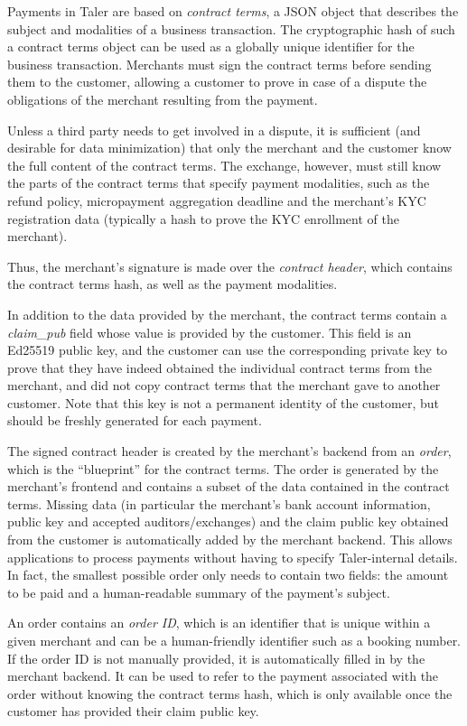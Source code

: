 Payments in Taler are based on \emph{contract terms}, a JSON object that
describes the subject and modalities of a business transaction.  The
cryptographic hash of such a contract terms object can be used as a globally
unique identifier for the business transaction.  Merchants must sign the
contract terms before sending them to the customer, allowing a customer to
prove in case of a dispute the obligations of the merchant resulting from the
payment.

Unless a third party needs to get involved in a dispute, it is sufficient (and
desirable for data minimization) that only the merchant and the customer know
the full content of the contract terms.  The exchange, however,  must still
know the parts of the contract terms that specify payment modalities, such as
the refund policy, micropayment aggregation deadline and the merchant's KYC
registration data (typically a hash to prove the KYC enrollment of the
merchant).

Thus, the merchant's signature is made over the \emph{contract header},
which contains the contract terms hash, as well as the payment modalities.

In addition to the data provided by the merchant, the contract terms contain a
\emph{claim\_pub} field whose value is provided by the customer.
This field is an Ed25519 public key, and the customer can use the corresponding
private key to prove that they have indeed obtained the individual contract
terms from the merchant, and did not copy contract terms that the merchant gave
to another customer.  Note that this key is not a permanent identity of the
customer, but should be freshly generated for each payment.

The signed contract header is created by the merchant's backend from an
\emph{order}, which is the ``blueprint'' for the contract terms.  The order is
generated by the merchant's frontend and contains a subset of the data
contained in the contract terms.  Missing data (in particular the merchant's
bank account information, public key and accepted auditors/exchanges) and
the claim public key obtained from the customer is automatically added by the merchant
backend.  This allows applications to process payments without having to
specify Taler-internal details.  In fact, the smallest possible order only
needs to contain two fields:  the amount to be paid and a human-readable
summary of the payment's subject.

An order contains an \emph{order ID}, which is an identifier that is unique
within a given merchant and can be a human-friendly identifier such as a
booking number.  If the order ID is not manually provided, it is automatically
filled in by the merchant backend.  It can be used to refer to the payment
associated with the order without knowing the contract terms hash, which is
only available once the customer has provided their claim public key.

